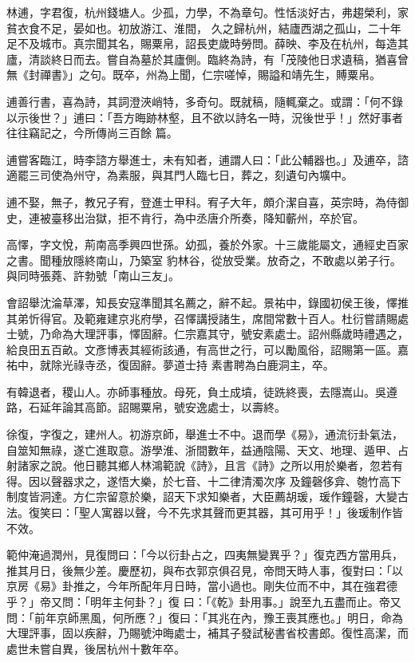 \begin{pinyinscope}
 林逋，字君復，杭州錢塘人。少孤，力學，不為章句。性恬淡好古，弗趨榮利，家貧衣食不足，晏如也。初放游江、淮間，
 久之歸杭州，結廬西湖之孤山，二十年足不及城市。真宗聞其名，賜粟帛，詔長吏歲時勞問。薛映、李及在杭州，每造其廬，清談終日而去。嘗自為墓於其廬側。臨終為詩，有「茂陵他日求遺稿，猶喜曾無《封禪書》」之句。既卒，州為上聞，仁宗嗟悼，賜謚和靖先生，賻粟帛。



 逋善行書，喜為詩，其詞澄浹峭特，多奇句。既就稿，隨輒棄之。或謂：「何不錄以示後世？」逋曰：「吾方晦跡林壑，且不欲以詩名一時，況後世乎！」然好事者往往竊記之，今所傳尚三百餘
 篇。



 逋嘗客臨江，時李諮方舉進士，未有知者，逋謂人曰：「此公輔器也。」及逋卒，諮適罷三司使為州守，為素服，與其門人臨七日，葬之，刻遺句內壙中。



 逋不娶，無子，教兄子宥，登進士甲科。宥子大年，頗介潔自喜，英宗時，為侍御史，連被臺移出治獄，拒不肯行，為中丞唐介所奏，降知蘄州，卒於官。



 高懌，字文悅，荊南高季興四世孫。幼孤，養於外家。十三歲能屬文，通經史百家之書。聞種放隱終南山，乃築室
 豹林谷，從放受業。放奇之，不敢處以弟子行。與同時張蕘、許勃號「南山三友」。



 會詔舉沈淪草澤，知長安寇準聞其名薦之，辭不起。景祐中，錄國初侯王後，懌推其弟忻得官。及範雍建京兆府學，召懌講授諸生，席間常數十百人。杜衍嘗請賜處士號，乃命為大理評事，懌固辭。仁宗嘉其守，號安素處士。詔州縣歲時禮遇之，給良田五百畝。文彥博表其經術該通，有高世之行，可以勵風俗，詔賜第一區。嘉祐中，就除光祿寺丞，復固辭。夢道士持
 素書聘為白鹿洞主，卒。



 有韓退者，稷山人。亦師事種放。母死，負土成墳，徒跣終喪，去隱嵩山。吳遵路，石延年論其高節。詔賜粟帛，號安逸處士，以壽終。



 徐復，字復之，建州人。初游京師，舉進士不中。退而學《易》，通流衍卦氣法，自筮知無祿，遂亡進取意。游學淮、浙間數年，益通陰陽、天文、地理、遁甲、占射諸家之說。他日聽其鄉人林鴻範說《詩》，且言《詩》之所以用於樂者，忽若有得。因以聲器求之，遂悟大樂，於七音、十二律清濁次序
 及鐘磬侈弇、匏竹高下制度皆洞達。方仁宗留意於樂，詔天下求知樂者，大臣薦胡瑗，瑗作鐘磬，大變古法。復笑曰：「聖人寓器以聲，今不先求其聲而更其器，其可用乎！」後瑗制作皆不效。



 範仲淹過潤州，見復問曰：「今以衍卦占之，四夷無變異乎？」復克西方當用兵，推其月日，後無少差。慶歷初，與布衣郭京俱召見，帝問天時人事，復對曰：「以京房《易》卦推之，今年所配年月日時，當小過也。剛失位而不中，其在強君德乎？」帝又問：「明年主何卦？」復
 曰：「《乾》卦用事。」說至九五盡而止。帝又問：「前年京師黑風，何所應？」復曰：「其兆在內，豫王喪其應也。」明日，命為大理評事，固以疾辭，乃賜號沖晦處士，補其子發試秘書省校書郎。復性高潔，而處世未嘗自異，後居杭州十數年卒。




\end{pinyinscope}

